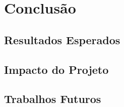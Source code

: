 \section{Conclusão}

\subsection{Resultados Esperados}

\subsection{Impacto do Projeto}

\subsection{Trabalhos Futuros}
